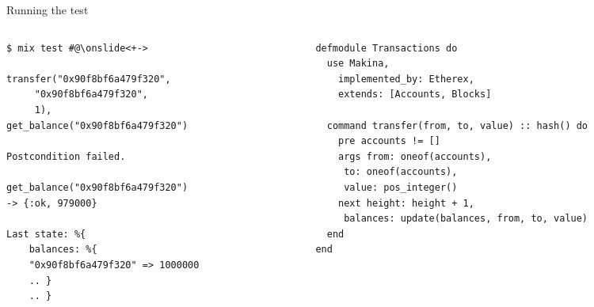 \documentclass[aspectratio=169, 10pt, handout]{beamer}
\begin{document}
\begin{frame}[label={sec:org06475be},fragile]{Running the test}
 \begin{columns}
\begin{column}{0.44\columnwidth}
\lstset{language=bash,label= ,caption= ,captionpos=b,numbers=none,style=shell}
\begin{lstlisting}
$ mix test #@\onslide<+->

transfer("0x90f8bf6a479f320",
	 "0x90f8bf6a479f320",
	 1),
get_balance("0x90f8bf6a479f320")

Postcondition failed.

get_balance("0x90f8bf6a479f320")
-> {:ok, 979000}

Last state: %{
    balances: %{
	"0x90f8bf6a479f320" => 1000000
	.. }
    .. }
\end{lstlisting}
\end{column}

\begin{column}{0.52\columnwidth}
\onslide<+->
\lstset{language=elixir,label= ,caption= ,captionpos=b,numbers=none,style=display}
\begin{lstlisting}
defmodule Transactions do
  use Makina,
    implemented_by: Etherex,
    extends: [Accounts, Blocks]

  command transfer(from, to, value) :: hash() do
    pre accounts != []
    args from: oneof(accounts),
	 to: oneof(accounts),
	 value: pos_integer()
    next height: height + 1,
	 balances: update(balances, from, to, value)
  end
end
\end{lstlisting}
\end{column}
\end{columns}
\end{frame}
\end{document}
